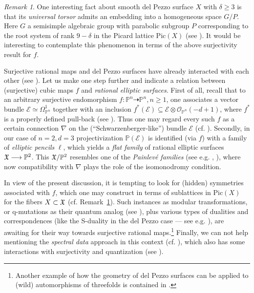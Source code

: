 \documentclass[14pt]{amsart}
\theoremstyle{definition}
\theoremstyle{remark}
\newtheorem{remark}[equation]{Remark}
\newcommand{\p}{\mathbb{P}}
\newcommand{\map}{\longrightarrow}
\begin{document}
\begin{remark}
\label{remark:torsor} One interesting fact about smooth del Pezzo
surface $X$ with $\delta \ge 3$ is that its \emph{universal
torsor} admits an embedding into a homogeneous space $G \slash P$.
Here $G$ a semisimple algebraic group with parabolic subgroup $P$
corresponding to the root system of rank $9 - \delta$ in the
Picard lattice $\text{Pic}(X)$ (see \cite{Serg-Skor}). It would be
interesting to contemplate this phenomenon in terms of the above
surjectivity result for $f$.
\end{remark}

Surjective rational maps and del Pezzo surfaces have already
interacted with each other (see \cite{Ilya-surj-dP}). Let us make
one step further and indicate a relation between (surjective)
cubic maps $f$ and \emph{rational elliptic surfaces}. First of
all, recall that to an arbitrary surjective endomorphism $f: \p^n
\dashrightarrow \p^n, n \ge 1$, one associates a vector bundle
$\mathcal{E} \simeq \Omega^1_{\p^n}$ together with an inclusion
$f^*(\mathcal{E}) \subseteq \mathcal{E} \otimes
\mathcal{O}_{\p^n}(-d+1)$, where $f^*$ is a properly defined
pull-back (see \cite{Ilya-ML}). Thus one may regard every such $f$
as a certain connection $\nabla$ on the (``Schwarzenberger-like'')
bundle $\mathcal{E}$ (cf. \cite[{\bf 2.2.2}]{Dol-CAG}). Secondly,
in our case of $n=2,d=3$ projectivization $\p(\mathcal{E})$ is
identified (via $f$) with a family of \emph{elliptic pencils}
$\ell$, which yields a \emph{flat family} of rational elliptic
surfaces $\frak{X} \map \p^2$. This $\frak{X} \slash \p^2$
resembles one of the \emph{Painlev\'e families} (see e.g.
\cite{Saito-Umemura}, \cite{Kajiwara-et-al}), where now
compatibility with $\nabla$ plays the role of the isomonodromy
condition.

In view of the present discussion, it is tempting to look for
(hidden) symmetries associated with $f$, which one may construct
in terms of sublattices in $\text{Pic}(X)$ for the fibers $X
\subset \frak{X}$ (cf. Remark~\ref{remark:torsor}). Such instances
as modular transformations, or q-mutations as their quantum analog
(see \cite{Usnich}), plus various types of dualities and
correspondences (like the S-duality in the del Pezzo case --- see
e.g. \cite{King}), are awaiting for their way towards surjective
rational maps.\footnote{Another example of how the geometry of del
Pezzo surfaces can be applied to (wild) automorphisms of
threefolds is contained in \cite{Ilya-dP-iso}.} Finally, we can
not help mentioning the \emph{spectral data} approach in this
context (cf. \cite{Hitchin}), which also has some interactions
with surjectivity and quantization (see \cite{Ilya-Quant}).
\end{document}
